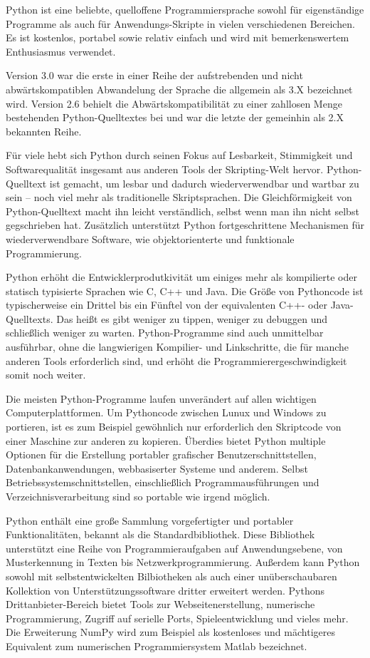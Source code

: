 Python ist eine beliebte, quelloffene Programmiersprache sowohl für eigenständige Programme als auch für Anwendungs-Skripte in vielen verschiedenen Bereichen. Es ist kostenlos, portabel sowie relativ einfach und wird  mit bemerkenswertem Enthusiasmus verwendet.

Version 3.0 war die erste in einer Reihe der aufstrebenden und nicht abwärtskompatiblen Abwandelung der Sprache die allgemein als 3.X bezeichnet wird. Version 2.6 behielt die Abwärtskompatibilität zu einer zahllosen Menge bestehenden Python-Quelltextes bei und war die letzte der gemeinhin als 2.X bekannten Reihe.

Für viele hebt sich Python durch seinen Fokus auf Lesbarkeit, Stimmigkeit und Softwarequalität insgesamt aus anderen Tools der Skripting-Welt hervor. Python-Quelltext ist gemacht, um lesbar und dadurch wiederverwendbar und wartbar zu sein -- noch viel mehr als traditionelle Skriptsprachen. Die Gleichförmigkeit von Python-Quelltext macht ihn leicht verständlich, selbst wenn man ihn nicht selbst gegschrieben hat. Zusätzlich unterstützt Python fortgeschrittene Mechanismen für wiederverwendbare Software, wie objektorienterte und funktionale Programmierung.

Python erhöht die Entwicklerprodutkivität um einiges mehr als kompilierte oder statisch typisierte Sprachen wie C, C++ und Java. Die Größe von Pythoncode ist typischerweise ein Drittel bis ein Fünftel von der equivalenten C++- oder Java-Quelltexts. Das heißt es gibt weniger zu tippen, weniger zu debuggen und schließlich weniger zu warten. Python-Programme sind auch unmittelbar ausführbar, ohne die langwierigen Kompilier- und Linkschritte, die für manche anderen Tools erforderlich sind, und erhöht die Programmierergeschwindigkeit somit noch weiter.

Die meisten Python-Programme laufen unverändert auf allen wichtigen Computerplattformen. Um Pythoncode zwischen Lunux und Windows zu portieren, ist es zum Beispiel gewöhnlich nur erforderlich den Skriptcode von einer Maschine zur anderen zu kopieren. Überdies bietet Python multiple Optionen für die Erstellung portabler grafischer Benutzerschnittstellen, Datenbankanwendungen, webbasiserter Systeme und anderem. Selbst Betriebssystemschnittstellen, einschließlich Programmausführungen und Verzeichnisverarbeitung sind so portable wie irgend möglich.

Python enthält eine große Sammlung vorgefertigter und portabler Funktionalitäten, bekannt als die Standardbibliothek. Diese Bibliothek unterstützt eine Reihe von Programmieraufgaben auf Anwendungsebene, von Musterkennung in Texten bis Netzwerkprogrammierung. Außerdem kann Python sowohl mit selbstentwickelten Bilbiotheken als auch einer unüberschaubaren Kollektion von Unterstützungssoftware dritter erweitert werden. Pythons Drittanbieter-Bereich bietet Tools zur Webseitenerstellung, numerische Programmierung, Zugriff auf serielle Ports, Spieleentwicklung und vieles mehr. Die Erweiterung NumPy wird zum Beispiel als kostenloses und mächtigeres Equivalent zum numerischen Programmiersystem Matlab bezeichnet.


